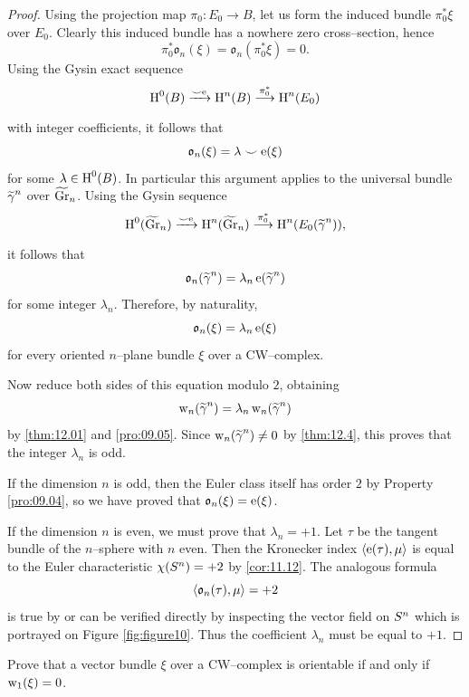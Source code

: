 \documentclass[../main]{subfiles}
\begin{document}
\begin{proof}
Using the projection map $\pi_0 : E_0 \longrightarrow B$, let us form the induced bundle $\pi_0^\ast \xi$ over $E_0$. Clearly this induced bundle has a nowhere zero cross--section, hence \[\pi_0^\ast {\mathfrak o}_n(\xi) = {\mathfrak o}_n(\pi_0^\ast \xi) = 0.\] Using the Gysin exact sequence \[\homology^0(B) \varrightarrow{\smile \eulerclass} \homology^n(B) \varrightarrow{\pi_0^\ast} \homology^n(E_0)\] with integer coefficients, it follows that \[{\mathfrak o}_n(\xi) = \lambda \smile \operatorname{e}(\xi)\] for some $\lambda \in \operatorname{H}^0(B)$. In particular this argument applies to the universal bundle ${\xtilde \gamma}^n$ over ${\xtilde \grassmannian}_n$. Using the Gysin sequence \[\homology^0({\xtilde \grassmannian}_n) \varrightarrow{\smile \eulerclass} \homology^n({\xtilde \grassmannian}_n) \varrightarrow{\pi_0^\ast} \homology^n(E_0({\xtilde \gamma}^n)),\] it follows that \[{\mathfrak o}_n({\xtilde \gamma}^n) = \lambda_n \eulerclass({\xtilde \gamma}^n)\] for some integer $\lambda_n$. Therefore, by naturality, \[{\mathfrak o}_n(\xi) = \lambda_n \operatorname{e}(\xi)\] for every oriented $n$--plane bundle $\xi$ over a CW--complex.

Now reduce both sides of this equation modulo $2$, obtaining \[\sw_n({\xtilde \gamma}^n) = \lambda_n \sw_n({\xtilde \gamma}^n)\] by \ref{thm:12.01} and \ref{pro:09.05}. Since $\sw_n({\xtilde \gamma}^n) \ne 0$ by \ref{thm:12.4}, this proves that the integer $\lambda_n$ is odd. 

If the dimension $n$ is odd, then the Euler class itself has order $2$ by Property \ref{pro:09.04}, so we have proved that ${\mathfrak o}_n(\xi) = \operatorname{e}(\xi)$.

If the dimension $n$ is even, we must prove that $\lambda_n = +1$. Let $\tau$ be the tangent bundle of the $n$--sphere with $n$ even. Then the Kronecker index $\langle\operatorname{e}(\tau),\mu\rangle$ is equal to the Euler characteristic $\chi(S^n) = +2$ by \ref{cor:11.12}. The analogous formula \[\langle{\mathfrak o}_n(\tau),\mu\rangle = +2\] is true by \cite[\S39.6]{steenrod1951} or can be verified directly by inspecting the vector field on $S^n$ which is portrayed on Figure \ref{fig:figure10}. Thus the coefficient $\lambda_n$ must be equal to $+1$. 
\end{proof}

\begin{problem}\label{prob:12.A}
Prove that a vector bundle $\xi$ over a CW--complex is orientable if and only if $\operatorname{w}_1(\xi) = 0$.
\end{problem}
\end{document}
